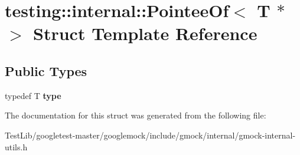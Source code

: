 \hypertarget{structtesting_1_1internal_1_1PointeeOf_3_01T_01_5_01_4}{}\section{testing\+:\+:internal\+:\+:Pointee\+Of$<$ T $\ast$ $>$ Struct Template Reference}
\label{structtesting_1_1internal_1_1PointeeOf_3_01T_01_5_01_4}
\subsection*{Public Types}
\begin{DoxyCompactItemize}
\item 
\mbox{\label{structtesting_1_1internal_1_1PointeeOf_3_01T_01_5_01_4_a91dde514cd3a8c07cedbe5336c36a55f}} 
typedef T {\bfseries type}
\end{DoxyCompactItemize}


The documentation for this struct was generated from the following file\+:\begin{DoxyCompactItemize}
\item 
Test\+Lib/googletest-\/master/googlemock/include/gmock/internal/gmock-\/internal-\/utils.\+h\end{DoxyCompactItemize}
